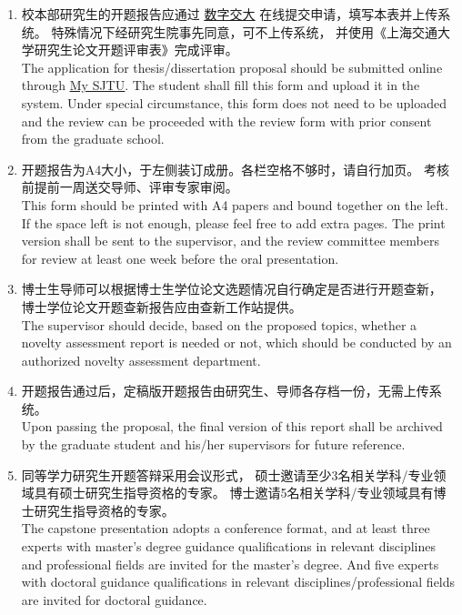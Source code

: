 \documentclass[a4paper,zihao=-4,AutoFakeBold]{ctexart}
\begin{document}
\begin{enumerate}
    \fangsong
    \item 校本部研究生的开题报告应通过%
          \href{http://my.sjtu.edu.cn/}{\color{blue}\underline{数字交大}}%
          在线提交申请，填写本表并上传系统。
          特殊情况下经研究生院事先同意，可不上传系统，
          并使用《上海交通大学研究生论文开题评审表》完成评审。
          \\[0.5\baselineskip]
          The application for thesis/dissertation proposal
          should be submitted online through
          \href{http://my.sjtu.edu.cn/}{\color{blue}\underline{My SJTU}}.
          The student shall fill this form and upload it in the system.
          Under special circumstance,
          this form does not need to be uploaded
          and the review can be proceeded with the review form
          with prior consent from the graduate school.

    \item 开题报告为A4大小，于左侧装订成册。各栏空格不够时，请自行加页。
          考核前提前一周送交导师、评审专家审阅。
          \\[0.5\baselineskip]
          This form should be printed with A4 papers
          and bound together on the left.
          If the space left is not enough,
          please feel free to add extra pages.
          The print version shall be sent to the supervisor,
          and the review committee members for review
          at least one week before the oral presentation.

    \item 博士生导师可以根据博士生学位论文选题情况自行确定是否进行开题查新，
          博士学位论文开题查新报告应由查新工作站提供。
          \\[0.5\baselineskip]
          The supervisor should decide, based on the proposed topics,
          whether a novelty assessment report is needed or not,
          which should be conducted by an authorized
          novelty assessment department.

    \item 开题报告通过后，定稿版开题报告由研究生、导师各存档一份，无需上传系统。
          \\[0.5\baselineskip]
          Upon passing the proposal,
          the final version of this report shall be archived by the
          graduate student and his/her supervisors for future reference.

    \item 同等学力研究生开题答辩采用会议形式，
          硕士邀请至少3名相关学科/专业领域具有硕士研究生指导资格的专家。
          博士邀请5名相关学科/专业领域具有博士研究生指导资格的专家。
          \\[0.5\baselineskip]
          The capstone presentation adopts a conference format,
          and at least three experts with master's degree guidance
          qualifications in relevant disciplines and professional fields
          are invited for the master's degree.
          And five experts with doctoral guidance qualifications
          in relevant disciplines/professional fields are invited
          for doctoral guidance.
\end{enumerate}
\end{document}
